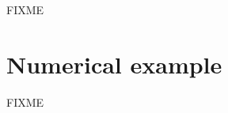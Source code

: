 \documentclass[a4paper]{article}
\begin{document}

FIXME

\section{Numerical example}


FIXME

\pagebreak
\printbibliography
\end{document}
